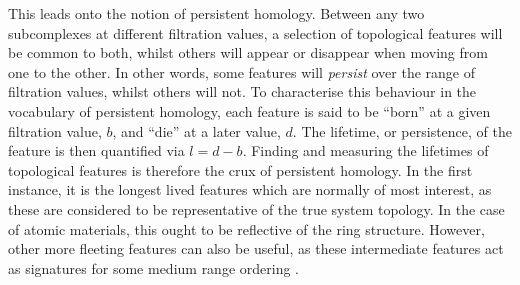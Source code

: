 This leads onto the notion of persistent homology.
Between any two subcomplexes at different filtration values, a selection of topological features will be common to both, whilst others will appear or disappear when moving from one to the other.
In other words, some features will \textit{persist} over the range of filtration values, whilst others will not.
To characterise this behaviour in the vocabulary of persistent homology, each feature is said to be ``born'' at a given filtration value, $b$, and ``die'' at a later value, $d$.
The lifetime, or persistence, of the feature is then quantified via $l=d-b$.
Finding and measuring the lifetimes of topological features is therefore the crux of persistent homology.
In the first instance, it is the longest lived features which are normally of most interest, as these are considered to be representative of the true system topology.
In the case of \td{} atomic materials, this ought to be reflective of the ring structure.
However, other more fleeting features can also be useful, as these intermediate features act as signatures for some medium range ordering \cite{Nakamura2015,Onodera2019}. 

